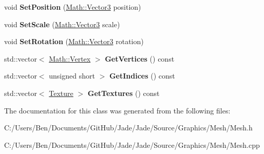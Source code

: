 \begin{DoxyCompactItemize}
\item 
\hypertarget{class_jade_1_1_graphics_1_1_mesh_ae9cd24f0cb18eef8e8d6c0bc34f78833}{}void {\bfseries Set\+Position} (\hyperlink{struct_jade_1_1_math_1_1_vector3}{Math\+::\+Vector3} position)\label{class_jade_1_1_graphics_1_1_mesh_ae9cd24f0cb18eef8e8d6c0bc34f78833}

\item 
\hypertarget{class_jade_1_1_graphics_1_1_mesh_abd59709323602cae48a75b315668b000}{}void {\bfseries Set\+Scale} (\hyperlink{struct_jade_1_1_math_1_1_vector3}{Math\+::\+Vector3} scale)\label{class_jade_1_1_graphics_1_1_mesh_abd59709323602cae48a75b315668b000}

\item 
\hypertarget{class_jade_1_1_graphics_1_1_mesh_a3e27c62c830f0294f1547ebddaf9fe43}{}void {\bfseries Set\+Rotation} (\hyperlink{struct_jade_1_1_math_1_1_vector3}{Math\+::\+Vector3} rotation)\label{class_jade_1_1_graphics_1_1_mesh_a3e27c62c830f0294f1547ebddaf9fe43}

\item 
\hypertarget{class_jade_1_1_graphics_1_1_mesh_adf39469f8cb0a2f524418b2d16e4fa40}{}std\+::vector$<$ \hyperlink{struct_jade_1_1_math_1_1_vertex}{Math\+::\+Vertex} $>$ {\bfseries Get\+Vertices} () const \label{class_jade_1_1_graphics_1_1_mesh_adf39469f8cb0a2f524418b2d16e4fa40}

\item 
\hypertarget{class_jade_1_1_graphics_1_1_mesh_aa89f4ea1dc8072bd273d23a40d80607a}{}std\+::vector$<$ unsigned short $>$ {\bfseries Get\+Indices} () const \label{class_jade_1_1_graphics_1_1_mesh_aa89f4ea1dc8072bd273d23a40d80607a}

\item 
\hypertarget{class_jade_1_1_graphics_1_1_mesh_ae14dfe06d6aa2801add2af78a901844d}{}std\+::vector$<$ \hyperlink{class_jade_1_1_graphics_1_1_texture}{Texture} $>$ {\bfseries Get\+Textures} () const \label{class_jade_1_1_graphics_1_1_mesh_ae14dfe06d6aa2801add2af78a901844d}

\end{DoxyCompactItemize}


The documentation for this class was generated from the following files\+:\begin{DoxyCompactItemize}
\item 
C\+:/\+Users/\+Ben/\+Documents/\+Git\+Hub/\+Jade/\+Jade/\+Source/\+Graphics/\+Mesh/Mesh.\+h\item 
C\+:/\+Users/\+Ben/\+Documents/\+Git\+Hub/\+Jade/\+Jade/\+Source/\+Graphics/\+Mesh/Mesh.\+cpp\end{DoxyCompactItemize}
